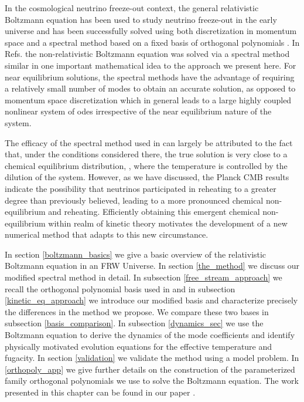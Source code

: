 In the cosmological neutrino freeze-out context, the general relativistic Boltzmann equation has been used to study neutrino freeze-out in the early universe and has been successfully solved using both discretization in momentum space \cite{Madsen,Dolgov_Hansen,Gnedin,Mangano2005} and a spectral method based on a fixed basis of orthogonal polynomials \cite{Esposito2000,Mangano2002}.    In Refs.\cite{Wilkening,Wilkening2} the non-relativistic Boltzmann equation was solved via a spectral method similar in  one important mathematical idea to the approach we present here.  For near equilibrium solutions, the spectral methods have the advantage of requiring a relatively small number of modes to obtain an accurate solution, as opposed to momentum space discretization which in general leads to a large highly coupled nonlinear system of odes irrespective of the near equilibrium nature of the system.  

The efficacy of the spectral method used in \cite{Esposito2000,Mangano2002} can largely be attributed to the fact that, under the conditions considered there, the true solution is very close to a chemical equilibrium distribution, , where the temperature is controlled by the dilution of the system. However, as we have discussed, the Planck CMB results \cite{Planck} indicate the possibility that neutrinos participated in reheating to a greater degree than previously believed, leading to a more pronounced chemical non-equilibrium and reheating. Efficiently obtaining this emergent chemical non-equilibrium within realm of kinetic theory motivates the development of a new numerical method that adapts to this new circumstance.

In section \ref{boltzmann_basics} we give a basic overview of the relativistic Boltzmann equation in an FRW Universe.  In section \ref{the_method} we discuss our modified spectral method in detail.  In subsection \ref{free_stream_approach} we recall the orthogonal polynomial basis used in \cite{Esposito2000,Mangano2002} and in subsection \ref{kinetic_eq_approach} we introduce our modified basis and characterize precisely the differences in the method  we propose. We compare these two bases in subsection \ref{basis_comparison}. In subsection \ref{dynamics_sec} we use the Boltzmann equation to derive the dynamics of the mode coefficients and identify physically motivated evolution equations for the effective temperature and fugacity.  In section \ref{validation} we validate the method using a model problem.  In  \ref{orthopoly_app} we give further details on the construction of the parameterized family orthogonal polynomials we use to solve the Boltzmann equation.  The work presented in this chapter can be found in our paper \cite{Birrell_orthopoly}.


